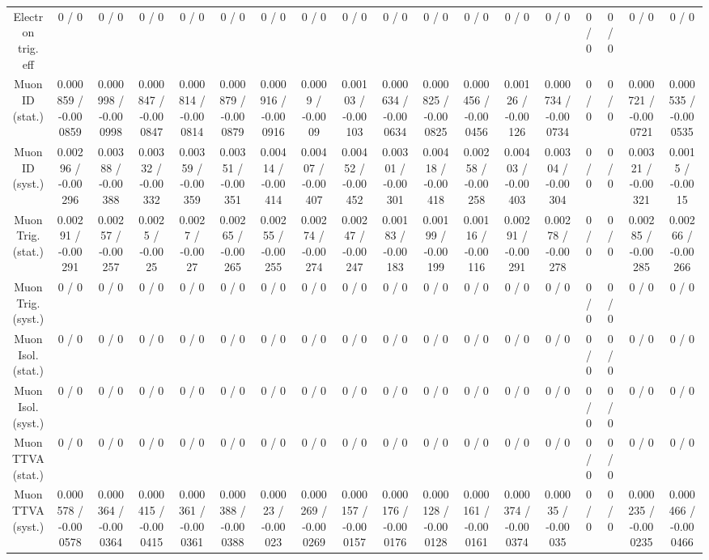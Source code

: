\documentclass[10pt]{article}
\begin{document}
\begin{table}[htbp]
\begin{center}
\begin{tabular}{|c|c|c|c|c|c|c|c|c|c|c|c|c|c|c|c|c|c|}
  Electron trig. eff & 0 / 0 & 0 / 0 & 0 / 0 & 0 / 0 & 0 / 0 & 0 / 0 & 0 / 0 & 0 / 0 & 0 / 0 & 0 / 0 & 0 / 0 & 0 / 0 & 0 / 0 & 0 / 0 & 0 / 0 & 0 / 0 & 0 / 0 \\ 
  Muon ID (stat.) & 0.000859 / -0.000859 & 0.000998 / -0.000998 & 0.000847 / -0.000847 & 0.000814 / -0.000814 & 0.000879 / -0.000879 & 0.000916 / -0.000916 & 0.0009 / -0.0009 & 0.00103 / -0.00103 & 0.000634 / -0.000634 & 0.000825 / -0.000825 & 0.000456 / -0.000456 & 0.00126 / -0.00126 & 0.000734 / -0.000734 & 0 / 0 & 0 / 0 & 0.000721 / -0.000721 & 0.000535 / -0.000535 \\ 
  Muon ID (syst.) & 0.00296 / -0.00296 & 0.00388 / -0.00388 & 0.00332 / -0.00332 & 0.00359 / -0.00359 & 0.00351 / -0.00351 & 0.00414 / -0.00414 & 0.00407 / -0.00407 & 0.00452 / -0.00452 & 0.00301 / -0.00301 & 0.00418 / -0.00418 & 0.00258 / -0.00258 & 0.00403 / -0.00403 & 0.00304 / -0.00304 & 0 / 0 & 0 / 0 & 0.00321 / -0.00321 & 0.0015 / -0.0015 \\ 
  Muon Trig. (stat.) & 0.00291 / -0.00291 & 0.00257 / -0.00257 & 0.0025 / -0.0025 & 0.0027 / -0.0027 & 0.00265 / -0.00265 & 0.00255 / -0.00255 & 0.00274 / -0.00274 & 0.00247 / -0.00247 & 0.00183 / -0.00183 & 0.00199 / -0.00199 & 0.00116 / -0.00116 & 0.00291 / -0.00291 & 0.00278 / -0.00278 & 0 / 0 & 0 / 0 & 0.00285 / -0.00285 & 0.00266 / -0.00266 \\ 
  Muon Trig. (syst.) & 0 / 0 & 0 / 0 & 0 / 0 & 0 / 0 & 0 / 0 & 0 / 0 & 0 / 0 & 0 / 0 & 0 / 0 & 0 / 0 & 0 / 0 & 0 / 0 & 0 / 0 & 0 / 0 & 0 / 0 & 0 / 0 & 0 / 0 \\ 
  Muon Isol. (stat.) & 0 / 0 & 0 / 0 & 0 / 0 & 0 / 0 & 0 / 0 & 0 / 0 & 0 / 0 & 0 / 0 & 0 / 0 & 0 / 0 & 0 / 0 & 0 / 0 & 0 / 0 & 0 / 0 & 0 / 0 & 0 / 0 & 0 / 0 \\ 
  Muon Isol. (syst.) & 0 / 0 & 0 / 0 & 0 / 0 & 0 / 0 & 0 / 0 & 0 / 0 & 0 / 0 & 0 / 0 & 0 / 0 & 0 / 0 & 0 / 0 & 0 / 0 & 0 / 0 & 0 / 0 & 0 / 0 & 0 / 0 & 0 / 0 \\ 
  Muon TTVA (stat.) & 0 / 0 & 0 / 0 & 0 / 0 & 0 / 0 & 0 / 0 & 0 / 0 & 0 / 0 & 0 / 0 & 0 / 0 & 0 / 0 & 0 / 0 & 0 / 0 & 0 / 0 & 0 / 0 & 0 / 0 & 0 / 0 & 0 / 0 \\ 
  Muon TTVA (syst.) & 0.000578 / -0.000578 & 0.000364 / -0.000364 & 0.000415 / -0.000415 & 0.000361 / -0.000361 & 0.000388 / -0.000388 & 0.00023 / -0.00023 & 0.000269 / -0.000269 & 0.000157 / -0.000157 & 0.000176 / -0.000176 & 0.000128 / -0.000128 & 0.000161 / -0.000161 & 0.000374 / -0.000374 & 0.00035 / -0.00035 & 0 / 0 & 0 / 0 & 0.000235 / -0.000235 & 0.000466 / -0.000466 \\ 

\end{tabular}
\end{center}
\end{table}
\end{document}
